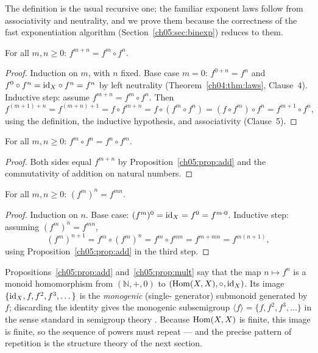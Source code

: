 The definition is the usual recursive one; the familiar exponent laws
follow from associativity and neutrality, and we prove them because the
correctness of the fast exponentiation algorithm
(Section~\ref{ch05:sec:binexp}) reduces to them.

\begin{proposition}
\label{ch05:prop:add}
For all $m, n \ge 0$: $f^{m+n} = f^{m} \circ f^{n}$.
\end{proposition}

\begin{proof}
Induction on $m$, with $n$ fixed. Base case $m = 0$:
$f^{0+n} = f^{n}$ and $f^{0} \circ f^{n} = \mathrm{id}_X \circ f^{n} = f^{n}$ by
left neutrality (Theorem~\ref{ch04:thm:laws}, Clause~4). Inductive step:
assume $f^{m+n} = f^{m} \circ f^{n}$. Then
\[
  f^{(m+1)+n}
  = f^{(m+n)+1}
  = f \circ f^{m+n}
  = f \circ (f^{m} \circ f^{n})
  = (f \circ f^{m}) \circ f^{n}
  = f^{m+1} \circ f^{n},
\]
using the definition, the inductive hypothesis, and associativity
(Clause~5).
\end{proof}

\begin{corollary}
\label{ch05:cor:commute}
For all $m, n \ge 0$: $f^{m} \circ f^{n} = f^{n} \circ f^{m}$.
\end{corollary}

\begin{proof}
Both sides equal $f^{m+n}$ by Proposition~\ref{ch05:prop:add} and the
commutativity of addition on natural numbers.
\end{proof}

\begin{proposition}
\label{ch05:prop:mult}
For all $m, n \ge 0$: $(f^{m})^{n} = f^{mn}$.
\end{proposition}

\begin{proof}
Induction on $n$. Base case: $(f^{m})^{0} = \mathrm{id}_X = f^{0} = f^{m \cdot 0}$.
Inductive step: assuming $(f^{m})^{n} = f^{mn}$,
\[
  (f^{m})^{n+1}
  = f^{m} \circ (f^{m})^{n}
  = f^{m} \circ f^{mn}
  = f^{m + mn}
  = f^{m(n+1)},
\]
using Proposition~\ref{ch05:prop:add} in the third step.
\end{proof}

\begin{remark}
\label{ch05:rem:monogenic}
Propositions~\ref{ch05:prop:add} and~\ref{ch05:prop:mult} say that the map
$n \mapsto f^{n}$ is a monoid homomorphism from $(\mathbb{N}, +, 0)$ to
$(\mathrm{Hom}(X, X), \circ, \mathrm{id}_X)$. Its image
$\{ \mathrm{id}_X, f, f^{2}, f^{3}, \dots \}$ is the \emph{monogenic} (single-
generator) submonoid generated by $f$; discarding the identity gives the
monogenic subsemigroup $\langle f \rangle = \{ f, f^{2}, f^{3}, \dots \}$
in the sense standard in semigroup theory \cite{howie}. Because
$\mathrm{Hom}(X, X)$ is finite, this image is finite, so the sequence of powers
must repeat --- and the precise pattern of repetition is the structure
theory of the next section.
\end{remark}

